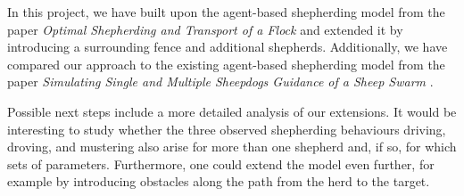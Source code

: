 In this project, we have built upon the agent-based shepherding model from the paper \textit{Optimal Shepherding and Transport of a Flock} \cite{ranganathan2022optimal} and extended it by introducing a surrounding fence and additional shepherds. Additionally, we have compared our approach to the existing agent-based shepherding model from the paper \textit{Simulating Single and Multiple
Sheepdogs Guidance of a Sheep Swarm} \cite{baxter2021simulating}.

Possible next steps include a more detailed analysis of our extensions. It would be interesting to study whether the three observed shepherding behaviours driving, droving, and mustering also arise for more than one shepherd and, if so, for which sets of parameters. Furthermore, one could extend the model even further, for example by introducing obstacles along the path from the herd to the target.